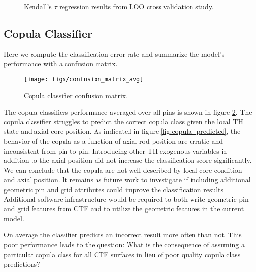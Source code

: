 \begin{figure}[H]%
    \centering
    \qquad
    \qquad
    \qquad
    \qquad
    \caption[Kendall's $\tau$ regression LOO results.]{Kendall's $\tau$ regression results from LOO cross validation study.}%
    \label{fig:ktauregression}%
\end{figure}


\subsection{Copula Classifier}

Here we compute the classification error rate and summarize the model's performance with a confusion matrix.

\begin{figure}[H]
    \centering
    \texttt{[image: figs/confusion\_matrix\_avg]}
    \caption[Copula classifier confusion matrix.]{Copula classifier confusion matrix.}
    \label{fig:confusionmatrixavg}
\end{figure}


The copula classifiers performance averaged over all pins is shown in figure \ref{fig:confusionmatrixavg}. The copula classifier struggles to predict the correct copula class given the local TH state and axial core position.  As indicated in figure \ref{fig:copula_predicted}, the behavior of the copula as a function of axial rod position are erratic and inconsistent from pin to pin.  Introducing other TH exogenous variables in addition to the axial position did not increase the classification score significantly.  We can conclude that the copula are not well described by local core condition and axial position.  It remains as future work to investigate if including additional geometric pin and grid attributes could improve the classification results.  Additional software infrastructure would be required to both write geometric pin and grid features from CTF and to utilize the geometric features in the current model.

On average the classifier predicts an incorrect result more often than not.  This poor performance leads to the question:  What is the consequence of assuming a particular copula class for all CTF surfaces in lieu of poor quality copula class predictions?  


